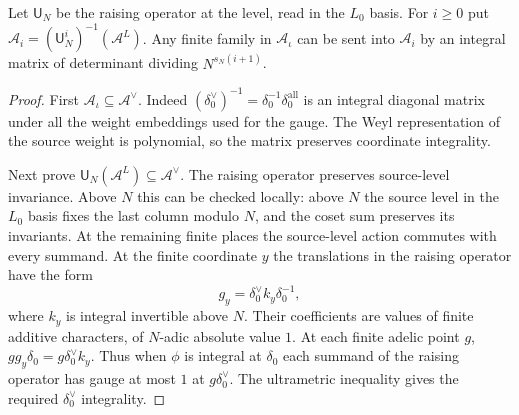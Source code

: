 \begin{lemma}
\label{lem:a-level-up-iterate}
\emitthmsource
Let $\mathsf U_N$ be the raising operator at the level, read in the $L_0$ basis. For $i\ge0$ put $\mathcal A_i=(\mathsf U_N^i)^{-1}(\mathcal A^L)$. Any finite family in $\mathcal A_\iota$ can be sent into $\mathcal A_i$ by an integral matrix of determinant dividing $N^{s_N(i+1)}$.
\end{lemma}
\begin{proof}
First $\mathcal A_\iota\subseteq\mathcal A^\vee$. Indeed $(\delta_0^\vee)^{-1}=\delta_0^{-1}\delta_0^{\mathrm{all}}$ is an integral diagonal matrix under all the weight embeddings used for the gauge. The Weyl representation of the source weight is polynomial, so the matrix preserves coordinate integrality.

Next prove $\mathsf U_N(\mathcal A^L)\subseteq\mathcal A^\vee$. The raising operator preserves source-level invariance. Above $N$ this can be checked locally: above $N$ the source level in the $L_0$ basis fixes the last column modulo $N$, and the coset sum preserves its invariants. At the remaining finite places the source-level action commutes with every summand. At the finite coordinate $y$ the translations in the raising operator have the form
\[
 g_y=\delta_0^\vee k_y\delta_0^{-1},
\]
where $k_y$ is integral invertible above $N$. Their coefficients are values of finite additive characters, of $N$-adic absolute value $1$. At each finite adelic point $g$,
$gg_y\delta_0=g\delta_0^\vee k_y$. Thus when $\phi$ is integral at $\delta_0$ each summand of the raising operator has gauge at most $1$ at $g\delta_0^\vee$. The ultrametric inequality gives the required $\delta_0^\vee$ integrality.


\end{proof}

